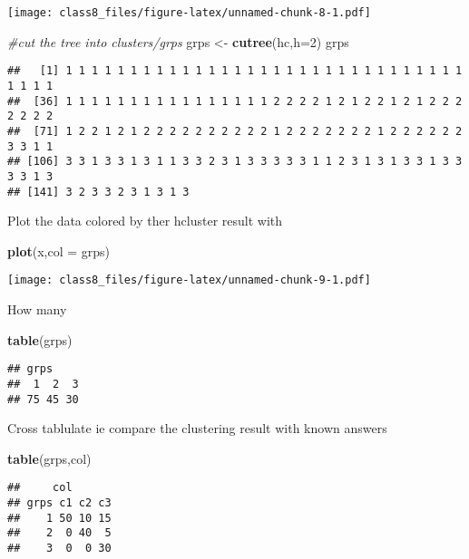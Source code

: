 \documentclass[]{article}
\newenvironment{Shaded}{\begin{snugshade}}{\end{snugshade}}
\newcommand{\KeywordTok}[1]{\textcolor[rgb]{0.13,0.29,0.53}{\textbf{#1}}}
\newcommand{\DataTypeTok}[1]{\textcolor[rgb]{0.13,0.29,0.53}{#1}}
\newcommand{\DecValTok}[1]{\textcolor[rgb]{0.00,0.00,0.81}{#1}}
\newcommand{\StringTok}[1]{\textcolor[rgb]{0.31,0.60,0.02}{#1}}
\newcommand{\CommentTok}[1]{\textcolor[rgb]{0.56,0.35,0.01}{\textit{#1}}}
\newcommand{\NormalTok}[1]{#1}
\begin{document}
\texttt{[image: class8\_files/figure-latex/unnamed-chunk-8-1.pdf]}

\begin{Shaded}
\begin{Highlighting}[]
\CommentTok{#cut the tree into clusters/grps}
\NormalTok{grps <-}\StringTok{ }\KeywordTok{cutree}\NormalTok{(hc,}\DataTypeTok{h=}\DecValTok{2}\NormalTok{)}
\NormalTok{grps}
\end{Highlighting}
\end{Shaded}

\begin{verbatim}
##   [1] 1 1 1 1 1 1 1 1 1 1 1 1 1 1 1 1 1 1 1 1 1 1 1 1 1 1 1 1 1 1 1 1 1 1 1
##  [36] 1 1 1 1 1 1 1 1 1 1 1 1 1 1 1 1 2 2 2 2 1 2 1 2 2 1 2 1 2 2 2 2 2 2 2
##  [71] 1 2 2 1 2 1 2 2 2 2 2 2 2 2 2 2 1 2 2 2 2 2 2 2 1 2 2 2 2 2 2 3 3 1 1
## [106] 3 3 1 3 3 1 3 1 1 3 3 2 3 1 3 3 3 3 3 1 1 2 3 1 3 1 3 3 1 3 3 3 3 1 3
## [141] 3 2 3 3 2 3 1 3 1 3
\end{verbatim}

Plot the data colored by ther hcluster result with

\begin{Shaded}
\begin{Highlighting}[]
\KeywordTok{plot}\NormalTok{(x,}\DataTypeTok{col =}\NormalTok{ grps)}
\end{Highlighting}
\end{Shaded}

\texttt{[image: class8\_files/figure-latex/unnamed-chunk-9-1.pdf]}

How many

\begin{Shaded}
\begin{Highlighting}[]
\KeywordTok{table}\NormalTok{(grps)}
\end{Highlighting}
\end{Shaded}

\begin{verbatim}
## grps
##  1  2  3 
## 75 45 30
\end{verbatim}

Cross tablulate ie compare the clustering result with known answers

\begin{Shaded}
\begin{Highlighting}[]
\KeywordTok{table}\NormalTok{(grps,col)}
\end{Highlighting}
\end{Shaded}

\begin{verbatim}
##     col
## grps c1 c2 c3
##    1 50 10 15
##    2  0 40  5
##    3  0  0 30
\end{verbatim}
\end{document}
